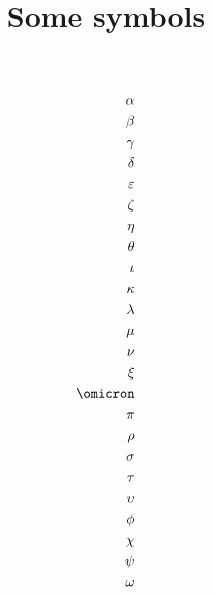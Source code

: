 \documentclass{article}
\title{Some symbols}
\begin{document}
\vspace*{-3cm}
{\Huge
\begin{align}
\alpha \\
\beta \\
\gamma \\
\delta \\
\varepsilon \\
\zeta \\
\eta \\
\theta \\
\iota \\
\kappa \\
\lambda \\
\mu \\
\nu \\
\xi \\
\omicron \\
\pi \\
\rho \\
\sigma \\
\tau \\
\upsilon \\
\phi \\
\chi \\
\psi \\
\omega
\end{align}
}
\end{document}
